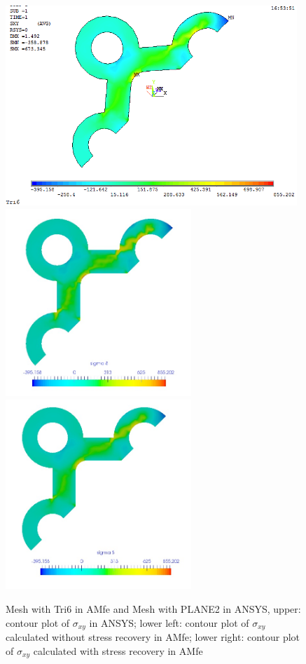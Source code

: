 \begin{figure}[htbp]
	\begin{center}
		\includegraphics[width=11cm,clip]{Tri6_Sxy.png} 		
		\includegraphics[width=7cm,clip]{Tri6_Sxy_PD.png} 		
		\includegraphics[width=7cm,clip]{Tri6_Sxy_P.png} 		
		\caption{Mesh with Tri6 in AMfe and Mesh with PLANE2 in ANSYS, upper: contour plot of $\sigma_{xy}$ in ANSYS; lower left: contour plot of $\sigma_{xy}$ calculated without stress recovery in AMfe; lower right: contour plot of $\sigma_{xy}$ calculated with stress recovery in AMfe} \label{fig: Tri6_Sxy}
	\end{center}
\end{figure}
\clearpage 


